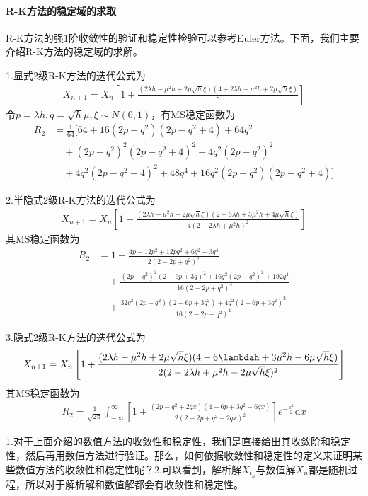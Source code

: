             \paragraph{R-K方法的稳定域的求取}R-K方法的强1阶收敛性的验证和稳定性检验可以参考Euler方法。下面，我们主要介绍R-K方法的稳定域的求解。
            \par
            1.显式2级R-K方法的迭代公式为
            \begin{align*}
            X_{n+1} = X_n \left[ 1+\frac{(2\lambda h- \mu ^2h + 2\mu \sqrt{h}\xi)(4+2\lambda h-\mu ^2h+2\mu\sqrt{h}\xi)}{8}  \right]
            \end{align*}
            令$p = \lambda h,q = \sqrt{h}\mu,\xi \sim N(0,1)$，有MS稳定函数为
            \begin{align*}
            R_2 &= \frac{1}{64}[64+16(2p-q^2)(2p-q^2+4)+64q^2\\
            &\quad+(2p-q^2)^2(2p-q^2+4)^2+4q^2(2p-q^2)^2\\
            &\quad+4q^2(2p-q^2+4)^2+48q^4+16q^2(2p-q^2)(2p-q^2+4)]
            \end{align*}
            \par
            2.半隐式2级R-K方法的迭代公式为
            \begin{align*}
            X_{n+1} = X_n\left[  1+ \frac{(2\lambda h - \mu^2h+2\mu\sqrt{h}\xi)(2-6\lambda h +3\mu^2 h+4\mu\sqrt{h}\xi)}{4(2-2\lambda h +\mu^2h)^2}\right]
            \end{align*}
            其MS稳定函数为
            \begin{align*}
            R_2 &= 1+\frac{4p-12p^2+12pq^2+6q^2-3q^4}{2(2-2p+q^2)^2}\\
            &\quad + \frac{(2p-q^2)^2(2-6p+3q)^2+16q^2(2p-q^2)^2+192q^4}{16(2-2p+q^2)^4}\\
            &\quad +\frac{32q^2(2p-q^2)(2-6p+3q^2)+4q^2(2-6p+3q^2)^2}{16(2-2p+q^2)^4}
            \end{align*}
            \par
            3.隐式2级R-K方法的迭代公式为
            \begin{align*}
            X_{n+1} = X_n\left[ 1+\frac{(2\lambda h-\mu^2h+2\mu\sqrt{h}\xi)(4-6\lambdah+3\mu^2h-6\mu\sqrt{h}\xi)}{2(2-2\lambda h+\mu^2h-2\mu\sqrt{h}\xi)^2} \right]
            \end{align*}
            其MS稳定函数为
            \begin{align*}
            R_2 = \frac{1}{\sqrt{2\pi}}\int_{-\infty}^{\infty}\left[ 1+\frac{(2p-q^2+2qx)(4-6p+3q^2-6qx)}{2(2-2p+q^2 - 2qx)^2} \right]e^{-\frac{x^2}{2}}\mathrm{d}x
            \end{align*}
            \par
            1.对于上面介绍的数值方法的收敛性和稳定性，我们是直接给出其收敛阶和稳定性，然后再用数值方法进行验证。那么，如何依据收敛性和稳定性的定义来证明某些数值方法的收敛性和稳定性呢？2.可以看到，解析解$X_{t_n}$与数值解$X_n$都是随机过程，所以对于解析解和数值解都会有收敛性和稳定性。
